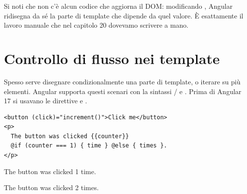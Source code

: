 Si noti che non c'è alcun codice che aggiorna il DOM: modificando
, Angular ridisegna da sé la parte di template che dipende da
quel valore. È esattamente il lavoro manuale che nel capitolo 20 dovevamo
scrivere a mano.

\section{Controllo di flusso nei template}

Spesso serve disegnare condizionalmente una parte di template, o iterare su più
elementi. Angular supporta questi scenari con la sintassi /
e . Prima di Angular 17 si usavano le direttive  e
.

\begin{affianco}[0.46][c]
\begin{lstlisting}[style=html, name=counter.component.html]
<button (click)="increment()">Click me</button>
<p>
  The button was clicked {{counter}}
  @if (counter === 1) { time } @else { times }.
</p>
\end{lstlisting}
\risultato
\begin{browser}[counter = 1]
  \par\vspace{4pt}
  {\Lato\large The button was clicked 1 time.\par}
\end{browser}
\begin{browser}[counter = 2]
  \par\vspace{4pt}
  {\Lato\large The button was clicked 2 times.\par}
\end{browser}
\end{affianco}

